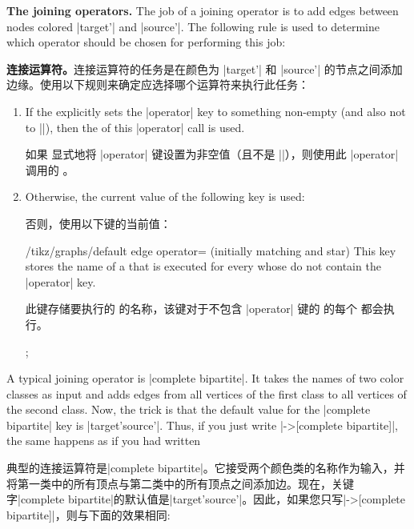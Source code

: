 \medskip
\textbf{The joining operators.} The job of a joining operator is to add edges
between nodes colored |target'| and |source'|. The following rule is used to
determine which operator should be chosen for performing this job:

\textbf{连接运算符。}连接运算符的任务是在颜色为 |target'| 和 |source'| 的节点之间添加边缘。使用以下规则来确定应选择哪个运算符来执行此任务：%

\begin{enumerate}
    \item If the  explicitly sets the |operator| key
        to something non-empty (and also not to |\relax|), then the 
        of this |operator| call is used.

        如果  显式地将 |operator| 键设置为非空值（且不是 |\relax|），则使用此 |operator| 调用的 。
    \item Otherwise, the current value of the following key is used:

        否则，使用以下键的当前值：
        \begin{key}{/tikz/graphs/default edge operator= (initially matching and star)}
            This key stores the name of a  that is executed for every
             whose  do not contain the
            |operator| key.
            
            此键存储要执行的  的名称，该键对于不包含 |operator| 键的  的每个  都会执行。
\begin{codeexample}[preamble={\usetikzlibrary{graphs}}]
\tikz {};
\end{codeexample}
        \end{key}
\end{enumerate}

A typical joining operator is |complete bipartite|. It takes the names of two
color classes as input and adds edges from all vertices of the first class to
all vertices of the second class. Now, the trick is that the default value for
the |complete bipartite| key is |{target'}{source'}|. Thus, if you just write
|->[complete bipartite]|, the same happens as if you had written

典型的连接运算符是|complete bipartite|。它接受两个颜色类的名称作为输入，并将第一类中的所有顶点与第二类中的所有顶点之间添加边。现在，关键字|complete bipartite|的默认值是|{target'}{source'}|。因此，如果您只写|->[complete bipartite]|，则与下面的效果相同:

